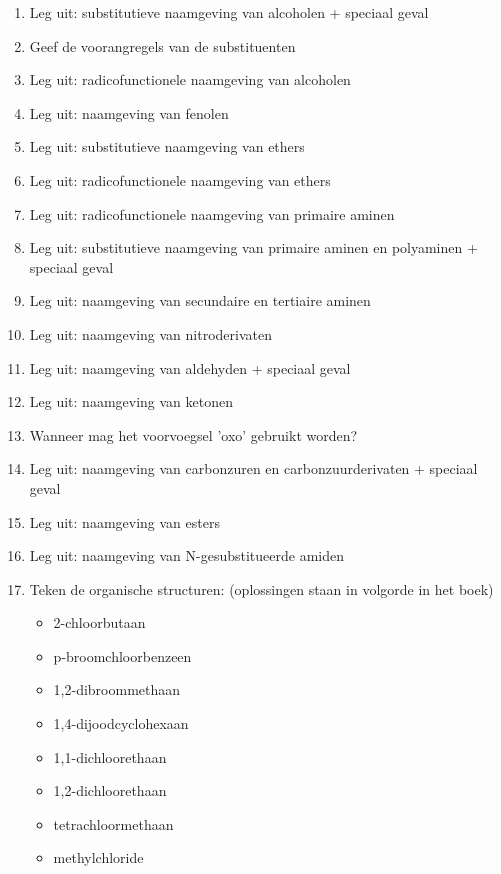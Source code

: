 \documentclass[a4paper,12pt]{article}
\begin{document}
\begin{enumerate}
\begin{enumerate}
            \item Leg uit: substitutieve naamgeving van alcoholen + speciaal geval
            \item Geef de voorangregels van de substituenten
            \item Leg uit: radicofunctionele naamgeving van alcoholen
            \item Leg uit: naamgeving van fenolen
            \item Leg uit: substitutieve naamgeving van ethers
            \item Leg uit: radicofunctionele naamgeving van ethers
            \item Leg uit: radicofunctionele naamgeving van primaire aminen 
            \item Leg uit: substitutieve naamgeving van primaire aminen en polyaminen + speciaal geval
            \item Leg uit: naamgeving van secundaire en tertiaire aminen 
            \item Leg uit: naamgeving van nitroderivaten
            \item Leg uit: naamgeving van aldehyden + speciaal geval
            \item Leg uit: naamgeving van ketonen
            \item Wanneer mag het voorvoegsel 'oxo' gebruikt worden?
            \item Leg uit: naamgeving van carbonzuren en carbonzuurderivaten + speciaal geval
            \item Leg uit: naamgeving van esters
            \item Leg uit: naamgeving van N-gesubstitueerde amiden
            \item Teken de organische structuren: (oplossingen staan in volgorde in het boek)
                \begin{itemize}
                    \item 2-chloorbutaan
                    \item p-broomchloorbenzeen
                    \item 1,2-dibroommethaan
                    \item 1,4-dijoodcyclohexaan
                    \item 1,1-dichloorethaan
                    \item 1,2-dichloorethaan
                    \item tetrachloormethaan
                    \item methylchloride

\end{itemize}
\end{enumerate}
\end{enumerate}
\end{document}
